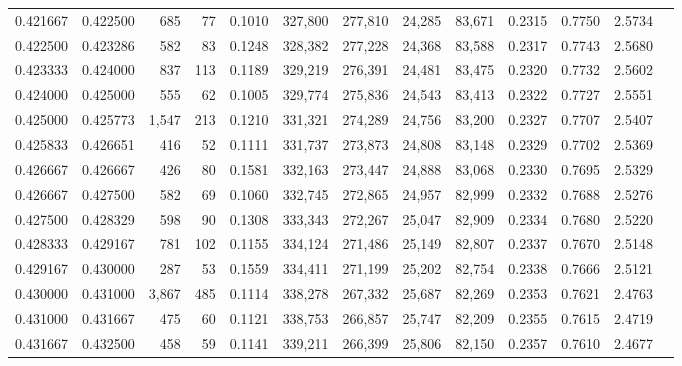 \begin{tabular}{rrrrrrrrrrrrr}
0.421667 & 0.422500 &   685 &  77 &                                     0.1010 & 327,800 & 277,810 &  24,285 &  83,671 & 0.2315 & 0.7750 & 2.5734 \\
0.422500 & 0.423286 &   582 &  83 &                                     0.1248 & 328,382 & 277,228 &  24,368 &  83,588 & 0.2317 & 0.7743 & 2.5680 \\
0.423333 & 0.424000 &   837 & 113 &                                     0.1189 & 329,219 & 276,391 &  24,481 &  83,475 & 0.2320 & 0.7732 & 2.5602 \\
0.424000 & 0.425000 &   555 &  62 &                                     0.1005 & 329,774 & 275,836 &  24,543 &  83,413 & 0.2322 & 0.7727 & 2.5551 \\
0.425000 & 0.425773 & 1,547 & 213 &                                     0.1210 & 331,321 & 274,289 &  24,756 &  83,200 & 0.2327 & 0.7707 & 2.5407 \\
0.425833 & 0.426651 &   416 &  52 &                                     0.1111 & 331,737 & 273,873 &  24,808 &  83,148 & 0.2329 & 0.7702 & 2.5369 \\
0.426667 & 0.426667 &   426 &  80 &                                     0.1581 & 332,163 & 273,447 &  24,888 &  83,068 & 0.2330 & 0.7695 & 2.5329 \\
0.426667 & 0.427500 &   582 &  69 &                                     0.1060 & 332,745 & 272,865 &  24,957 &  82,999 & 0.2332 & 0.7688 & 2.5276 \\
0.427500 & 0.428329 &   598 &  90 &                                     0.1308 & 333,343 & 272,267 &  25,047 &  82,909 & 0.2334 & 0.7680 & 2.5220 \\
0.428333 & 0.429167 &   781 & 102 &                                     0.1155 & 334,124 & 271,486 &  25,149 &  82,807 & 0.2337 & 0.7670 & 2.5148 \\
0.429167 & 0.430000 &   287 &  53 &                                     0.1559 & 334,411 & 271,199 &  25,202 &  82,754 & 0.2338 & 0.7666 & 2.5121 \\
0.430000 & 0.431000 & 3,867 & 485 &                                     0.1114 & 338,278 & 267,332 &  25,687 &  82,269 & 0.2353 & 0.7621 & 2.4763 \\
0.431000 & 0.431667 &   475 &  60 &                                     0.1121 & 338,753 & 266,857 &  25,747 &  82,209 & 0.2355 & 0.7615 & 2.4719 \\
0.431667 & 0.432500 &   458 &  59 &                                     0.1141 & 339,211 & 266,399 &  25,806 &  82,150 & 0.2357 & 0.7610 & 2.4677 \\

\end{tabular}
